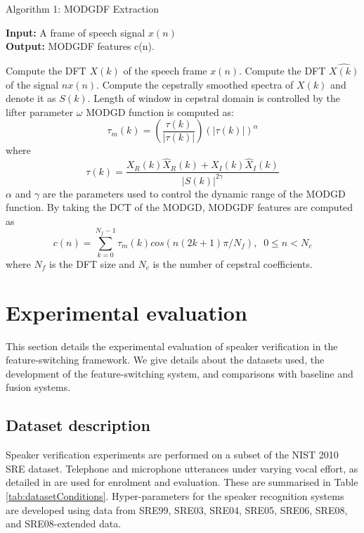 \documentclass{article}
\begin{document}
\begin{algorithm}
\caption{Algorithm 1: MODGDF Extraction}
\label{alg:mgdExtraction}
\textbf{Input:} A frame of speech signal $x(n)$  \\
\textbf {Output:} MODGDF features c(n). 
\begin{algorithmic}[1]
\State Compute the DFT $X(k)$ of the speech frame $x(n)$. 
\State Compute the DFT $\hat{X(k)}$ of the signal $nx(n)$. 
\State Compute the cepstrally smoothed spectra of $X(k)$ and denote it as $S(k)$. 
Length of window in cepstral domain is controlled by the lifter parameter $\omega$ 
\State MODGD function is computed as:
		\begin{equation*}
			\tau_{m}(k)=\left( \frac{\tau (k)}{\left| \tau (k) \right|} \right) \left( \left| \tau(k) \right| \right)^{\alpha}
	\end{equation*} where
	\begin{equation*}
		 \tau(k)=\frac{X_R(k)\hat{X}_R(k)+X_I(k)\hat{X}_I(k)}{\left| S(k)\right|^{2\gamma}}
	\end{equation*} $\alpha$ and $\gamma$ are the parameters used to control the 
	dynamic range of the MODGD function.
\State By taking the DCT of the MODGD, MODGDF features are computed as 
\begin{equation*}
	c(n)=\sum_{k=0}^{N_f-1}\tau_m(k)cos(n(2k+1)\pi/N_f), \;\; 0\leq n < N_c
	\end{equation*}	
	where $N_f$	is the DFT size and $N_c$ is the number of cepstral coefficients.

\end{algorithmic}
\end{algorithm}

\section{Experimental evaluation}
\label{sec:expts}
This section details the experimental evaluation of speaker verification in the
feature-switching framework. We give details about the datasets used, the
development of the feature-switching system, and comparisons with baseline and
fusion systems.

\subsection{Dataset description}
\label{sec:dB}
Speaker verification experiments are performed on a subset of
the NIST 2010 SRE dataset. Telephone and microphone utterances under varying 
vocal effort, as detailed in \cite{nist2010SRE} are used for enrolment and 
evaluation. These are summarised in Table \ref{tab:datasetConditions}. 
Hyper-parameters for the speaker recognition systems are developed using data 
from SRE99, SRE03, SRE04, SRE05, SRE06, SRE08, and SRE08-extended data.
\end{document}
